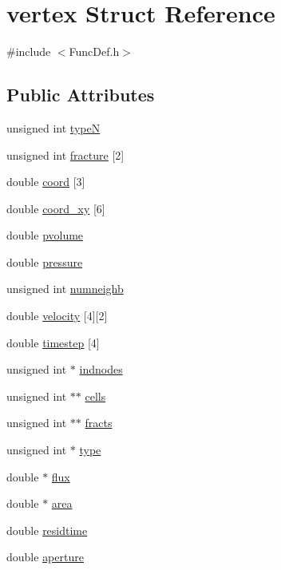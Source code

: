 \hypertarget{structvertex}{}\section{vertex Struct Reference}
\label{structvertex}


{\ttfamily \#include $<$Func\+Def.\+h$>$}

\subsection*{Public Attributes}
\begin{DoxyCompactItemize}
\item 
unsigned int \mbox{\hyperlink{structvertex_aa8c5c50393696a507d20dda8ec69fd51}{typeN}}
\item 
unsigned int \mbox{\hyperlink{structvertex_aa2cd06573422bc415cb8f38a67232de7}{fracture}} \mbox{[}2\mbox{]}
\item 
double \mbox{\hyperlink{structvertex_a1eff0deab63f96c97ba5098608d65ad3}{coord}} \mbox{[}3\mbox{]}
\item 
double \mbox{\hyperlink{structvertex_a3473aebf2ce957df8c02095cc98ebb39}{coord\+\_\+xy}} \mbox{[}6\mbox{]}
\item 
double \mbox{\hyperlink{structvertex_a7cf1594124712ff00a9e4d00926f1010}{pvolume}}
\item 
double \mbox{\hyperlink{structvertex_a54ac97be271319fa385aef0685ea0641}{pressure}}
\item 
unsigned int \mbox{\hyperlink{structvertex_acf83b561551952403148f73fe032f57b}{numneighb}}
\item 
double \mbox{\hyperlink{structvertex_a92493253fc12b459eb0599ec07c56743}{velocity}} \mbox{[}4\mbox{]}\mbox{[}2\mbox{]}
\item 
double \mbox{\hyperlink{structvertex_a5e4c0ee67478edf757b52b50859dd25e}{timestep}} \mbox{[}4\mbox{]}
\item 
unsigned int $\ast$ \mbox{\hyperlink{structvertex_a82e41673a29352ee0f004ae7890d5266}{indnodes}}
\item 
unsigned int $\ast$$\ast$ \mbox{\hyperlink{structvertex_a583032cadaa99e8f5c044d3bd10191cf}{cells}}
\item 
unsigned int $\ast$$\ast$ \mbox{\hyperlink{structvertex_adc1951216db706914f5963da2e58accc}{fracts}}
\item 
unsigned int $\ast$ \mbox{\hyperlink{structvertex_aeabf5788639be2723927c854aa11cd33}{type}}
\item 
double $\ast$ \mbox{\hyperlink{structvertex_a9934ed428ad1db71c9aa1e601649791c}{flux}}
\item 
double $\ast$ \mbox{\hyperlink{structvertex_aff6495cfbefb8dffd8714d7c68810ca6}{area}}
\item 
double \mbox{\hyperlink{structvertex_a6ee9434e764f4105136cb10a8c5be642}{residtime}}
\item 
double \mbox{\hyperlink{structvertex_a7588fad77cf759d8db0957c9e957e23a}{aperture}}
\end{DoxyCompactItemize}


